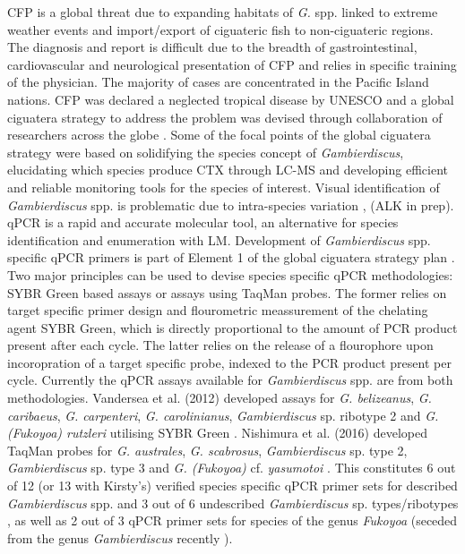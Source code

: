 \documentclass[12pt]{article}
\begin{document}
CFP is a global threat due to expanding habitats of \emph{G.} spp. linked to extreme weather events and import/export of ciguateric fish to non-ciguateric regions. The diagnosis and report is difficult due to the breadth of gastrointestinal, cardiovascular and neurological presentation of CFP and relies in specific training of the physician. The majority of cases are concentrated in the Pacific Island nations. CFP was declared a neglected tropical disease by UNESCO and a global ciguatera strategy to address the problem was devised through collaboration of researchers across the globe \cite{globalcig}. Some of the focal points of the global ciguatera strategy were based on solidifying the species concept of \emph{Gambierdiscus}, elucidating which species produce CTX through LC-MS and developing efficient and reliable monitoring tools for the species of interest. Visual identification of \emph{Gambierdiscus} spp. is problematic due to intra-species variation \cite{kohli2014high}, (ALK in prep).\\
qPCR is a rapid and accurate molecular tool, an alternative for species identification and enumeration with LM. Development of \emph{Gambierdiscus} spp. specific qPCR primers is part of Element 1 of the global ciguatera strategy plan \cite{globalcig}. Two major principles can be used to devise species specific qPCR methodologies: SYBR Green based assays or assays using TaqMan probes. The former relies on target specific primer design and flourometric meassurement of the chelating agent SYBR Green, which is directly proportional to the amount of PCR product present after each cycle. The latter relies on the release of a flourophore upon incoropration of a target specific probe, indexed to the PCR product present per cycle. Currently the qPCR assays available for  \emph{Gambierdiscus} spp. are from both methodologies. Vandersea et al. (2012) developed assays for \emph{G. belizeanus}, \emph{G. caribaeus}, \emph{G. carpenteri}, \emph{G. carolinianus}, \emph{Gambierdiscus} sp. ribotype 2 and \emph{G. (Fukoyoa) rutzleri} utilising SYBR Green \cite{vandersea2012development}. Nishimura et al. (2016) developed TaqMan probes for  \emph{G. australes}, \emph{G. scabrosus}, \emph{Gambierdiscus} sp. type 2, \emph{Gambierdiscus} sp. type 3 and \emph{G. (Fukoyoa)} cf. \emph{yasumotoi} \cite{nishimura2016quantitative}. This constitutes 6 out of 12 (or 13 with Kirsty's) verified species specific qPCR primer sets for described \emph{Gambierdiscus} spp. and  3 out of 6 undescribed \emph{Gambierdiscus} sp. types/ribotypes , as well as 2 out of 3 qPCR primer sets for species of the genus \emph{Fukoyoa} (seceded from the genus \emph{Gambierdiscus} recently \cite{gomez2015fukuyoa}).\\
\end{document}
